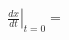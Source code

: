 \documentclass[preview]{standalone}
\begin{document}
\begin{align*}
\left. \frac{dx}{dt} \right|_{t=0} =
\end{align*}
\end{document}
